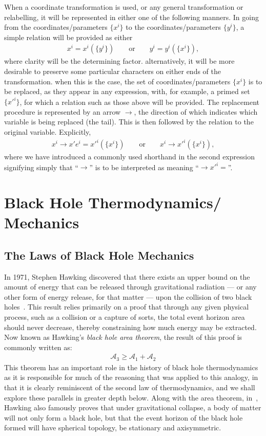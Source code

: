 \documentclass[
twoside,
openright,
frontopenright
]{dmathesis}
\begin{document}
When a coordinate transformation is used, or any general transformation or
relabelling, it will be represented in either one of the following manners. In
going from the coordinates/parameters $\{x^i\}$ to the coordinates/parameters
$\{y^i\}$, a simple relation will be provided as either
\begin{align*}
  x^i = x^i(\{y^i\})\qquad \mbox{or} \qquad y^i = y^i(\{x^i\}),
\end{align*}
where clarity will be the determining factor. alternatively, it will be more
desirable to preserve some particular characters on either ends of the
transformation. when this is the case, the set of coordinates/parameters
$\{x^i\}$ is to be replaced, as they appear in any expression, with, for
example, a primed set $\{x'^i\}$, for which a relation such as those above
will be provided. The replacement procedure is represented by an arrow $\to$,
the direction of which indicates which variable is being replaced (the
tail). This is then followed by the relation to the original
variable. Explicitly,
\begin{align*}
  x^i \to x'e^i=x'^i(\{x^i\}) \qquad \mbox{or} \qquad x^i \to x'^i(\{x^i\}),
\end{align*}
where we have introduced a commonly used shorthand in the second expression
signifying simply that ``$\to$'' is to be interpreted as meaning
``$\to x'^i =$''.

\chapter{Black Hole Thermodynamics/ Mechanics}
\label{chap:BHTD}

\section{The Laws of Black Hole Mechanics}
\label{sec:fourlaws}

In 1971, Stephen Hawking discovered that there exists an upper bound on the
amount of energy that can be released through gravitational radiation --- or any
other form of energy release, for that matter --- upon the collision of two
black holes~\cite{Hawking:1971tu,Hawking:1971vc}. This result relies primarily
on a proof that through any given physical process, such as a collision or a
capture of sorts, the total event horizon area should never decrease, thereby
constraining how much energy may be extracted. Now known as Hawking's
\emph{black hole area theorem}, the result of this proof is commonly written as:
\begin{align}
  \label{eq:areatheorem}
  \mathcal{A}_3 \geqslant \mathcal{A}_1+\mathcal{A}_2
\end{align}
This theorem has an important role in the history of black hole thermodynamics
as it is responsible for much of the reasoning that was applied to this analogy,
in that it is clearly reminiscent of the second law of thermodynamics, and we
shall explore these parallels in greater depth below. Along with the area
theorem, in~\cite{Hawking:1971vc}, Hawking also famously proves that under
gravitational collapse, a body of matter will not only form a black hole, but
that the event horizon of the black hole formed will have spherical topology, be
stationary and axisymmetric.
\end{document}

